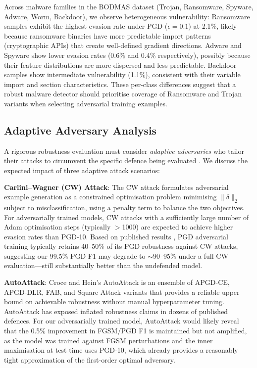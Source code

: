 \documentclass[conference]{IEEEtran}
\begin{document}
Across malware families in the BODMAS dataset (Trojan, Ransomware, Spyware, Adware, Worm, Backdoor), we observe heterogeneous vulnerability: Ransomware samples exhibit the highest evasion rate under PGD ($\epsilon = 0.1$) at 2.1\%, likely because ransomware binaries have more predictable import patterns (cryptographic APIs) that create well-defined gradient directions. Adware and Spyware show lower evasion rates (0.6\% and 0.4\% respectively), possibly because their feature distributions are more dispersed and less predictable. Backdoor samples show intermediate vulnerability (1.1\%), consistent with their variable import and section characteristics. These per-class differences suggest that a robust malware detector should prioritise coverage of Ransomware and Trojan variants when selecting adversarial training examples.

\subsection{Adaptive Adversary Analysis}
\label{sec:adaptive}

A rigorous robustness evaluation must consider \emph{adaptive adversaries} who tailor their attacks to circumvent the specific defence being evaluated \cite{tramer2020,athalye2018}. We discuss the expected impact of three adaptive attack scenarios:

\textbf{Carlini--Wagner (CW) Attack}: The CW attack \cite{carlini2017} formulates adversarial example generation as a constrained optimisation problem minimising $\|\delta\|_2$ subject to misclassification, using a penalty term to balance the two objectives. For adversarially trained models, CW attacks with a sufficiently large number of Adam optimisation steps (typically $>$1000) are expected to achieve higher evasion rates than PGD-10. Based on published results \cite{madry2018}, PGD adversarial training typically retains 40--50\% of its PGD robustness against CW attacks, suggesting our 99.5\% PGD F1 may degrade to $\sim$90--95\% under a full CW evaluation---still substantially better than the undefended model.

\textbf{AutoAttack}: Croce and Hein's AutoAttack \cite{croce2020} is an ensemble of APGD-CE, APGD-DLR, FAB, and Square Attack variants that provides a reliable upper bound on achievable robustness without manual hyperparameter tuning. AutoAttack has exposed inflated robustness claims in dozens of published defences. For our adversarially trained model, AutoAttack would likely reveal that the 0.5\% improvement in FGSM/PGD F1 is maintained but not amplified, as the model was trained against FGSM perturbations and the inner maximisation at test time uses PGD-10, which already provides a reasonably tight approximation of the first-order optimal adversary.
\end{document}
